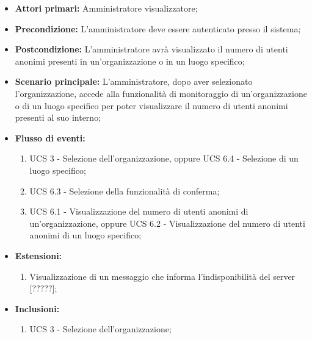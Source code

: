 \begin{itemize}
\item \textbf{Attori primari:} Amministratore visualizzatore;
\item \textbf{Precondizione:} L'amministratore deve essere autenticato presso il sistema;
\item \textbf{Postcondizione:} L'amministratore avrà visualizzato il numero di utenti anonimi presenti in un'organizzazione o in un luogo specifico;
\item \textbf{Scenario principale:} L'amministratore, dopo aver selezionato l'organizzazione, accede alla funzionalità di monitoraggio di un'organizzazione o di un luogo specifico per poter visualizzare il numero di utenti anonimi presenti al suo interno;
\item \textbf{Flusso di eventi:}
\begin{enumerate}
	\item UCS 3 - Selezione dell'organizzazione, oppure UCS 6.4 - Selezione di un luogo specifico;
	\item UCS 6.3 - Selezione della funzionalità di conferma;
	\item UCS 6.1 - Visualizzazione del numero di utenti anonimi di un'organizzazione, oppure UCS 6.2 - Visualizzazione del numero di utenti anonimi di un luogo specifico;
\end{enumerate}
\item \textbf{Estensioni:}  
\begin{enumerate}
	\item Visualizzazione di un messaggio che informa l’indisponibilità del server [?????];
\end{enumerate}
\item \textbf{Inclusioni:}
\begin{enumerate}
	\item UCS 3 - Selezione dell'organizzazione;
\end{enumerate}
\end{itemize}

